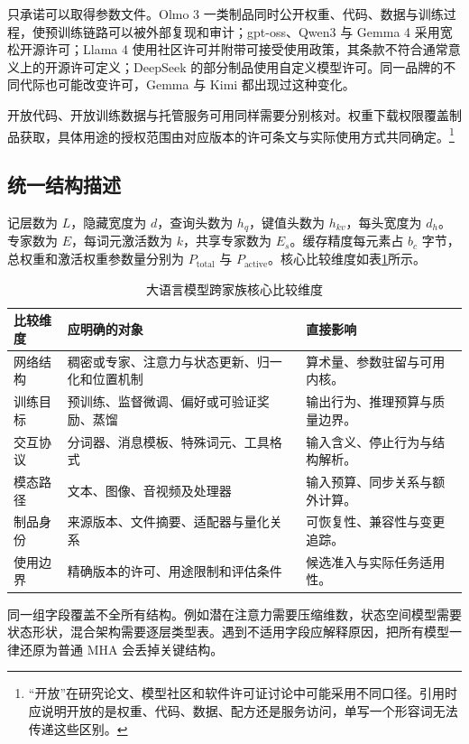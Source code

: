 \documentclass[../textbook.tex]{subfiles}
\begin{document}
只承诺可以取得参数文件。Olmo 3 一类制品同时公开权重、代码、数据与训练过程，使预训练链路可以被外部复现和审计\cite{olmoteam2025olmo3}；gpt-oss、Qwen3 与 Gemma 4 采用宽松开源许可\cite{openai2025gptoss,qwen2025qwen3,gemmateam2026gemma4}；Llama 4 使用社区许可并附带可接受使用政策，其条款不符合通常意义上的开源许可定义\cite{meta2025llama4modelcard}；DeepSeek 的部分制品使用自定义模型许可。同一品牌的不同代际也可能改变许可，Gemma 与 Kimi 都出现过这种变化。

开放代码、开放训练数据与托管服务可用同样需要分别核对。权重下载权限覆盖制品获取，具体用途的授权范围由对应版本的许可条文与实际使用方式共同确定。\footnote{“开放”在研究论文、模型社区和软件许可证讨论中可能采用不同口径。引用时应说明开放的是权重、代码、数据、配方还是服务访问，单写一个形容词无法传递这些区别。}

\subsection{统一结构描述}
记层数为 $L$，隐藏宽度为 $d$，查询头数为 $h_q$，键值头数为 $h_{kv}$，每头宽度为 $d_h$。专家数为 $E$，每词元激活数为 $k$，共享专家数为 $E_s$。缓存精度每元素占 $b_c$ 字节，总权重和激活权重参数量分别为 $P_{\mathrm{total}}$ 与 $P_{\mathrm{active}}$。核心比较维度如表\ref{tab:open-comparison-dimensions}所示。

\begin{table}[htbp]
\centering
\caption{大语言模型跨家族核心比较维度}\label{tab:open-comparison-dimensions}
\begin{tabularx}{\linewidth}{p{28mm}XX}
\toprule 比较维度 & 应明确的对象 & 直接影响\\\midrule
网络结构 & 稠密或专家、注意力与状态更新、归一化和位置机制 & 算术量、参数驻留与可用内核。\\
训练目标 & 预训练、监督微调、偏好或可验证奖励、蒸馏 & 输出行为、推理预算与质量边界。\\
交互协议 & 分词器、消息模板、特殊词元、工具格式 & 输入含义、停止行为与结构解析。\\
模态路径 & 文本、图像、音视频及处理器 & 输入预算、同步关系与额外计算。\\
制品身份 & 来源版本、文件摘要、适配器与量化关系 & 可恢复性、兼容性与变更追踪。\\
使用边界 & 精确版本的许可、用途限制和评估条件 & 候选准入与实际任务适用性。\\
\bottomrule
\end{tabularx}
\end{table}
同一组字段覆盖不全所有结构。例如潜在注意力需要压缩维数，状态空间模型需要状态形状，混合架构需要逐层类型表。遇到不适用字段应解释原因，把所有模型一律还原为普通 MHA 会丢掉关键结构。
\end{document}
